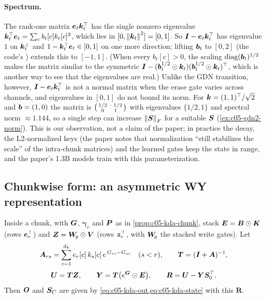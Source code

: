 \paragraph{Spectrum.} The rank-one matrix $\bm{e}_t\bm{k}_t^{\top}$ has the single nonzero eigenvalue
$\bm{k}_t^{\top}\bm{e}_t = \sum_c b_t[c]k_t[c]^2$, which lies in $[0, \left\lVert \bm{k}_t\right\rVert^2] = [0,1]$. So
$\bm{I} - \bm{e}_t\bm{k}_t^{\top}$ has eigenvalue $1$ on $\bm{k}_t^\perp$ and $1 - \bm{k}_t^{\top}\bm{e}_t \in [0,1]$ on one
more direction; lifting $\bm{b}_t$ to $[0,2]$ (the code's ) extends this to
$[-1,1]$. (When every $b_t[c] > 0$, the scaling $\operatorname{diag}(\bm{b}_t)^{1/2}$ makes the matrix similar to
the symmetric $\bm{I} - (\bm{b}_t^{1/2}\odot\bm{k}_t)(\bm{b}_t^{1/2}\odot\bm{k}_t)^{\top}$, which is another way to see
that the eigenvalues are real.) Unlike the GDN transition, however, $\bm{I} - \bm{e}_t\bm{k}_t^{\top}$ is not a
normal matrix when the erase gate varies across channels, and eigenvalues in $[0,1]$ do not bound
its norm. For $\bm{k} = (1,1)^{\top}/\sqrt2$ and $\bm{b} = (1,0)$ the matrix is
$\begin{psmallmatrix}1/2&-1/2\\0&1\end{psmallmatrix}$ with eigenvalues $\{1/2, 1\}$ and spectral
norm $\approx 1.144$, so a single step can increase $\left\lVert \bm{S}\right\rVert_F$ for a suitable $\bm{S}$
(\cref{ex:c05-gdn2-norm}). This is our observation, not a claim of the paper; in practice the decay,
the L2-normalized keys (the paper notes that normalization ``still stabilizes the scale'' of the
intra-chunk matrices) and the learned gates keep the state in range, and the paper's 1.3B models
train with this parameterization.

\subsection{Chunkwise form: an asymmetric WY representation}\label{sec:c05-gdn2-chunk}

\begin{proposition}\label{prop:c05-gdn2-chunk}
Inside a chunk, with $\bm{G}$, $\bm\gamma_r$ and $\bm{P}$ as in \cref{prop:c05-kda-chunk}, stack
$\bm E = \bm{B}\odot\bm{K}$ (rows $\bm{e}_r^{\top}$) and $\bm{Z} = \bm{W}_{\!g}\odot\bm{V}$ (rows $\bm{z}_r^{\top}$, with $\bm{W}_{\!g}$
the stacked write gates). Let
\begin{equation}\label{eq:c05-gdn2-A}
  \bm{A}_{rs} = \sum_{c=1}^{d_k} e_r[c]\,k_s[c]\,e^{\,G_{rc}-G_{sc}}\quad (s < r),\qquad
  \bm{T} = (\bm{I} + \bm{A})^{-1},
\end{equation}
\begin{equation}\label{eq:c05-gdn2-UY}
  \bm{U} = \bm{T}\bm{Z},\qquad \bm{Y} = \bm{T}\big(e^{\bm{G}}\odot\bm E\big),\qquad \bm R = \bm{U} - \bm{Y}\bm{S}_0^{\top} .
\end{equation}
Then $\bm{O}$ and $\bm{S}_C$ are given by \cref{eq:c05-kda-out,eq:c05-kda-state} with this $\bm R$.
\end{proposition}

